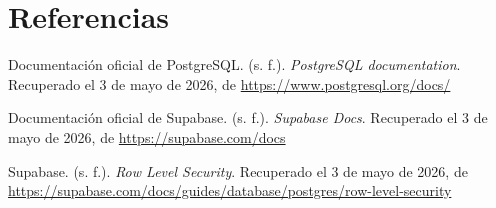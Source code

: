 \documentclass[12pt,letterpaper]{article}
\begin{document}
\newpage
\section*{Referencias}

Documentación oficial de PostgreSQL. (s. f.). \textit{PostgreSQL documentation}. Recuperado el 3 de mayo de 2026, de \url{https://www.postgresql.org/docs/}

Documentación oficial de Supabase. (s. f.). \textit{Supabase Docs}. Recuperado el 3 de mayo de 2026, de \url{https://supabase.com/docs}

Supabase. (s. f.). \textit{Row Level Security}. Recuperado el 3 de mayo de 2026, de \url{https://supabase.com/docs/guides/database/postgres/row-level-security}
\end{document}
